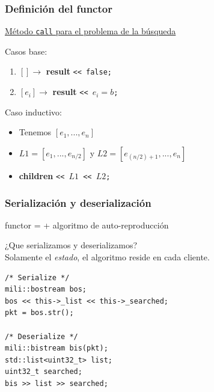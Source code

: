 \begin{frame}\frametitle{Definición del functor}
    \begin{center}
        \underline{Método \texttt{call} para el problema de la búsqueda}
    \end{center}
    \vspace{0.3cm}
    Casos base:\\
    \begin{enumerate}
        \item   $[] \rightarrow$ \textbf{result} \texttt{<< false;}
        \item   $[e_i] \rightarrow$ \textbf{result} \texttt{<< $e_i = b$;}
    \end{enumerate}
    \vspace{0.5cm}
    \pause
    Caso inductivo:\\
    \begin{itemize}
        \item   Tenemos $[e_1, ..., e_n]$
        \pause
        \item   $L1=[e_1, ..., e_{n/2}]$ y $L2=[e_{(n/2)+1}, ..., e_n]$
        \pause
        \item   \textbf{children} \texttt{<< $L1$ << $L2$;}
    \end{itemize}
    
\end{frame}

\begin{frame}[fragile]\frametitle{Serialización y deserialización}
    \begin{block}{}\centering functor =  + algoritmo de auto-reproducción\end{block}
    \vspace{0.3cm}
    \begin{center}
        ¿Que serializamos y deserializamos?\\[0.2cm]
        \pause
        Solamente el \textit{estado}, el algoritmo reside en cada cliente.
    \end{center}
    \pause
    \lstset{language=C++}
    \begin{lstlisting}[frame=single]
/* Serialize */
mili::bostream bos;
bos << this->_list << this->_searched;
pkt = bos.str();

/* Deserialize */
mili::bistream bis(pkt);
std::list<uint32_t> list;
uint32_t searched;
bis >> list >> searched;
    \end{lstlisting}
\end{frame}

